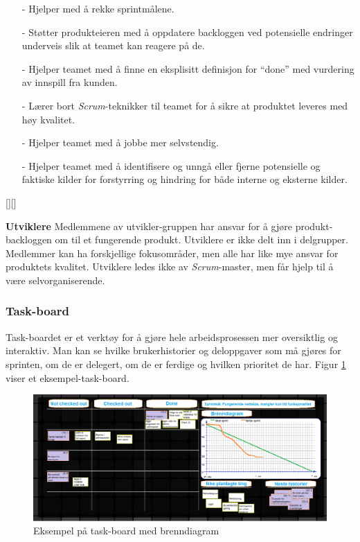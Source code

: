 \documentclass[12pt,a4paper,norsk]{article}
\begin{document}
    \begin{itemize}
    \item[-] Hjelper med å rekke sprintmålene.
    \item[-] Støtter produkteieren med å oppdatere backloggen ved potensielle endringer underveis slik at teamet kan reagere på de.
    \item[-]  Hjelper teamet med å finne en eksplisitt definisjon for “done” med vurdering av innspill fra kunden.
    \item[-]  Lærer bort \textit{Scrum}-teknikker til teamet for å sikre at produktet leveres med høy kvalitet.
    \item[-]  Hjelper teamet med å jobbe mer selvstendig.
    \item[-]  Hjelper teamet med å identifisere og unngå eller fjerne potensielle og faktiske kilder for forstyrring og hindring for både interne og eksterne kilder.
    \end{itemize}[\cite{scrummaster}][\cite{scrummasterrolle}]

    \bigskip \noindent \textbf{Utviklere}
        Medlemmene av utvikler-gruppen har ansvar for å gjøre produkt-backloggen om til et fungerende produkt. Utviklere er ikke delt inn i delgrupper. Medlemmer kan ha forskjellige fokusområder, men alle har like mye ansvar for produktets kvalitet. Utviklere ledes ikke av \textit{Scrum}-master, men får hjelp til å være selvorganiserende.

  \subsubsection{Task-board}
  Task-boardet er et verktøy for å gjøre hele arbeidsprosessen mer oversiktlig og interaktiv. Man kan se hvilke brukerhistorier og deloppgaver som må gjøres for sprinten, om de er delegert, om de er ferdige og hvilken prioritet de har. Figur \ref{fig:task-board} viser et eksempel-task-board.

    \begin{figure}[h!]
    \includegraphics[width=\linewidth]{img/task-board.png}
      \caption{Eksempel på task-board med brenndiagram}
      \label{fig:task-board}
  \end{figure}
\end{document}
